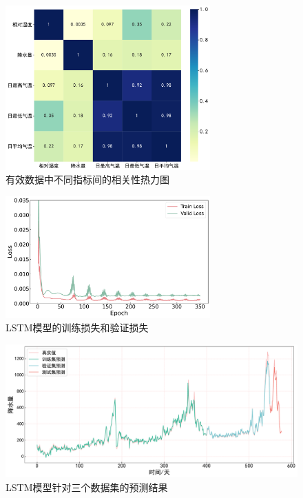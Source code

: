 \begin{figure}[ht]
  \centering
  \includegraphics[width=0.7\textwidth]{./Img/相关性热力图.pdf}
  \caption{有效数据中不同指标间的相关性热力图}\label{fig:4-7-a}
\end{figure}

\begin{figure}[ht]
  \centering
  \includegraphics[width=0.7\textwidth]{./Img/LSTM_loss.pdf}
  \caption{LSTM模型的训练损失和验证损失}\label{fig:4-7}
\end{figure}

\begin{figure}[t]
  \centering
  \includegraphics[width=1.0\textwidth]{./Img/LSTM_pre.pdf}
  \caption{LSTM模型针对三个数据集的预测结果}\label{fig:4-8}
\end{figure}

